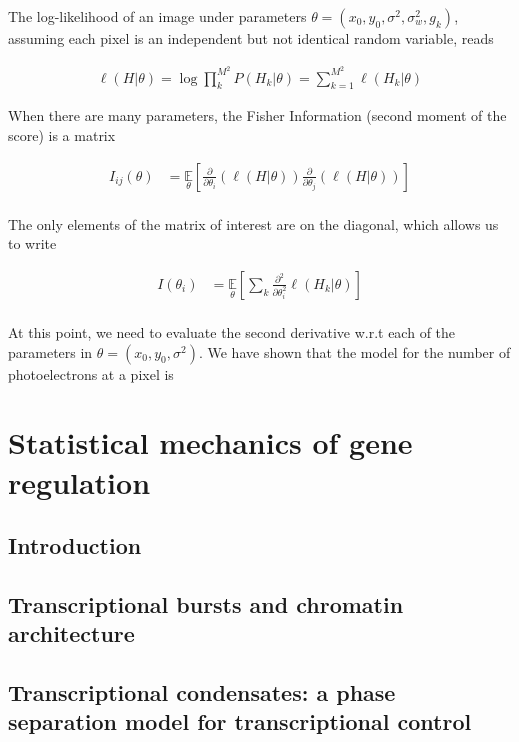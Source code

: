 \documentclass{ucetd}
\begin{document}
\vspace{0.2in}
The log-likelihood of an image under parameters $\theta = (x_{0},y_{0},\sigma^{2},\sigma_{w}^{2},g_{k})$, assuming each pixel is an independent but not identical random variable, reads

\begin{align*}
\ell(H|\theta) = \log\prod_{k}^{M^{2}} P(H_{k}|\theta) = \sum_{k=1}^{M^{2}} \ell (H_{k}|\theta)
\end{align*}


When there are many parameters, the Fisher Information (second moment of the score) is a matrix

\begin{align*}
I_{ij}(\theta) &= \underset{\theta}{\mathbb{E}}\left[\frac{\partial}{\partial\theta_{i}} \left(\ell(H|\theta)\right)\frac{\partial}{\partial\theta_{j}} \left(\ell(H|\theta)\right)\right]\\
\end{align*}

The only elements of the matrix of interest are on the diagonal, which allows us to write

\begin{align*}
I(\theta_{i}) &= \underset{\theta}{\mathbb{E}}\left[\sum_{k}\frac{\partial^{2}}{\partial\theta_{i}^{2}}  \ell (H_{k}|\theta)\right]\\
\end{align*}

At this point, we need to evaluate the second derivative w.r.t each of the parameters in $\theta = (x_{0},y_{0},\sigma^{2})$. We have shown that the model for the number of photoelectrons at a pixel is


\chapter{Statistical mechanics of gene regulation}

\section{Introduction}

\section{Transcriptional bursts and chromatin architecture}

\section{Transcriptional condensates: a phase separation model for transcriptional control}
\end{document}

